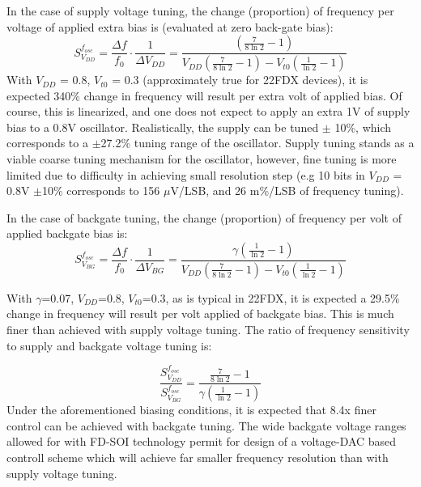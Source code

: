 		In the case of supply voltage tuning, the change (proportion) of frequency per voltage of applied extra bias is (evaluated at zero back-gate bias):
		\begin{equation}
			S^{f_{osc}}_{V_{DD}} = \frac{\Delta f}{f_0}\cdot\frac{1}{\Delta V_{DD}}  = \frac{\left(\frac{7}{8\ln2}-1\right)}{V_{DD}\left(\frac{7}{8\ln2}-1\right)-V_{t0}\left(\frac{1}{\ln2}-1\right)}
		\end{equation}
		With $V_{DD}$ = 0.8, $V_{t0}$ = 0.3 (approximately true for 22FDX devices), it is expected 340\% change in frequency will result per extra volt of applied bias. Of course, this is linearized, and one does not expect to apply an extra 1V of supply bias to a 0.8V oscillator. Realistically, the supply can be tuned $\pm$ 10\%, which corresponds to a $\pm$27.2\% tuning range of the oscillator. Supply tuning stands as a viable coarse tuning mechanism for the oscillator, however, fine tuning is more limited due to difficulty in achieving small resolution step (e.g 10 bits in $V_{DD}$ = 0.8V $\pm$10\% corresponds to 156 $\mu$V/LSB, and 26 m\%/LSB of frequency tuning).

		\par In the case of backgate tuning, the change (proportion) of frequency per volt of applied backgate bias is:
		\begin{equation}
			S^{f_{osc}}_{V_{BG}} = \frac{\Delta f}{f_0}\cdot\frac{1}{\Delta V_{BG}}  = \frac{\gamma \left(\frac{1}{\ln2}-1\right)}{V_{DD}\left(\frac{7}{8\ln2}-1\right)-V_{t0}\left(\frac{1}{\ln2}-1\right)}
		\end{equation}

		With $\gamma$=0.07, $V_{DD}$=0.8, $V_{t0}$=0.3, as is typical in 22FDX, it is expected a 29.5\% change in frequency will result per volt applied of backgate bias. This is much finer than achieved with supply voltage tuning. The ratio of frequency sensitivity to supply and backgate voltage tuning is:

		\begin{equation}
			\frac{S^{f_{osc}}_{V_{DD}}}{S^{f_{osc}}_{V_{BG}}} =  \frac{\frac{7}{8\ln2}-1}{\gamma \left(\frac{1}{\ln2}-1\right)}
		\end{equation}
		Under the aforementioned biasing conditions, it is expected that 8.4x finer control can be achieved with backgate tuning. The wide backgate voltage ranges allowed for with FD-SOI technology permit for design of a voltage-DAC based controll scheme which will achieve far smaller frequency resolution than with supply voltage tuning. 

